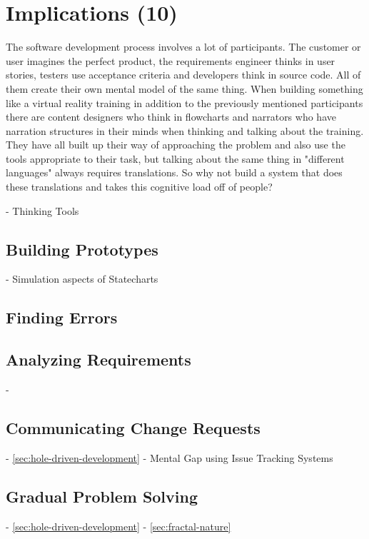 \chapter{Implications (10)}

The software development process involves a lot of participants. The customer or user imagines the perfect product, the requirements engineer thinks in user stories, testers use acceptance criteria and developers think in source code. All of them create their own mental model of the same thing. When building something like a virtual reality training in addition to the previously mentioned participants there are content designers who think in flowcharts and narrators who have narration structures in their minds when thinking and talking about the training.
They have all built up their way of approaching the problem and also use the tools appropriate to their task, but talking about the same thing in "different languages" always requires translations. So why not build a system that does these translations and takes this cognitive load off of people?



- Thinking Tools \autocite[273--274]{kitchenham_research_1990}

\section{Building Prototypes}
- Simulation aspects of Statecharts \autocite[7]{harel_statecharts_2007}

\section{Finding Errors}

\section{Analyzing Requirements}
- \autocite{leveson_experiences_1991}

\section{Communicating Change Requests}
- \ref{sec:hole-driven-development}
- Mental Gap using Issue Tracking Systems

\section{Gradual Problem Solving}
- \ref{sec:hole-driven-development}
- \ref{sec:fractal-nature}
